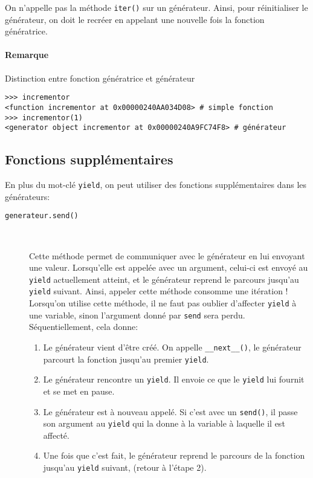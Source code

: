 On n'appelle pas la méthode \texttt{iter()} sur un générateur. Ainsi, pour réinitialiser le générateur, on doit le recréer en appelant une nouvelle fois la fonction génératrice.

\paragraph{Remarque} Distinction entre fonction génératrice et générateur
\begin{verbatim}
>>> incrementor
<function incrementor at 0x00000240AA034D08> # simple fonction
>>> incrementor(1)
<generator object incrementor at 0x00000240A9FC74F8> # générateur
\end{verbatim}

\subsection{Fonctions supplémentaires}
En plus du mot-clé \texttt{yield}, on peut utiliser des fonctions supplémentaires dans les générateurs:
\begin{description}
    \item[\texttt{generateur.send()}]~

    Cette méthode permet de communiquer avec le générateur en lui envoyant une valeur. Lorsqu'elle est appelée avec un argument, celui-ci est envoyé au \texttt{yield} actuellement atteint, et le générateur reprend le parcours jusqu'au \texttt{yield} suivant. Ainsi, appeler cette méthode consomme une itération ! Lorsqu'on utilise cette méthode, il ne faut pas oublier d'affecter \texttt{yield} à une variable, sinon l'argument donné par \texttt{send} sera perdu. Séquentiellement, cela donne:
    \begin{enumerate}
        \item Le générateur vient d'être créé. On appelle \texttt{__next__()}, le générateur parcourt la fonction jusqu'au premier \texttt{yield}.
        \item Le générateur rencontre un \texttt{yield}. Il envoie ce que le \texttt{yield} lui fournit et se met en pause.
        \item Le générateur est à nouveau appelé. Si c'est avec un \texttt{send()}, il passe son argument au \texttt{yield} qui la donne à la variable à laquelle il est affecté.
        \item Une fois que c'est fait, le générateur reprend le parcours de la fonction jusqu'au \texttt{yield} suivant, (retour à l'étape 2).
    \end{enumerate}

\end{description}

